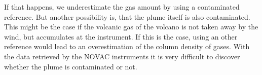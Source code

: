 If that happens, we underestimate the gas amount by using a contaminated reference. But another possibility is, that the plume itself is also contaminated. This might be the case if the volcanic gas of the volcano is not taken away by the wind, but accumulates at the instrument. If this is the case, using an other reference would lead to an overestimation of the column density of gases. With the data retrieved by the NOVAC instruments it is very difficult to discover whether the plume is contaminated or not. \\

